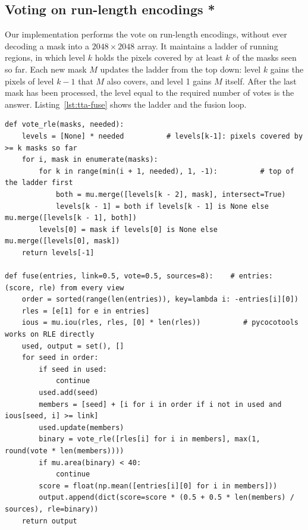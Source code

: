 \subsection{Voting on run-length encodings *}\label{sec:tta-ladder}
Our implementation performs the vote on run-length encodings, without ever decoding a mask into a
$2048\times2048$ array. It maintains a ladder of running regions, in which level $k$ holds the
pixels covered by at least $k$ of the masks seen so far. Each new mask $M$ updates the ladder from the
top down: level $k$ gains the pixels of level $k-1$ that $M$ also covers, and level 1 gains $M$
itself. After the last mask has been processed, the level equal to the required number of votes is
the answer. Listing~\ref{lst:tta-fuse} shows the ladder and the fusion loop.

\begin{lstlisting}[caption={Exact $k$-of-$n$ voting on RLE, and the greedy fusion. Condensed from
\file{experiments/exp\_033\_inference/src/cached\_tta.py} and
\file{experiments/exp\_097\_runpod\_yolo/src/evaluate\_ensemble.py}.},label=lst:tta-fuse]
def vote_rle(masks, needed):
    levels = [None] * needed          # levels[k-1]: pixels covered by >= k masks so far
    for i, mask in enumerate(masks):
        for k in range(min(i + 1, needed), 1, -1):          # top of the ladder first
            both = mu.merge([levels[k - 2], mask], intersect=True)
            levels[k - 1] = both if levels[k - 1] is None else mu.merge([levels[k - 1], both])
        levels[0] = mask if levels[0] is None else mu.merge([levels[0], mask])
    return levels[-1]

def fuse(entries, link=0.5, vote=0.5, sources=8):    # entries: (score, rle) from every view
    order = sorted(range(len(entries)), key=lambda i: -entries[i][0])
    rles = [e[1] for e in entries]
    ious = mu.iou(rles, rles, [0] * len(rles))          # pycocotools works on RLE directly
    used, output = set(), []
    for seed in order:
        if seed in used:
            continue
        used.add(seed)
        members = [seed] + [i for i in order if i not in used and ious[seed, i] >= link]
        used.update(members)
        binary = vote_rle([rles[i] for i in members], max(1, round(vote * len(members))))
        if mu.area(binary) < 40:
            continue
        score = float(np.mean([entries[i][0] for i in members]))
        output.append(dict(score=score * (0.5 + 0.5 * len(members) / sources), rle=binary))
    return output
\end{lstlisting}

